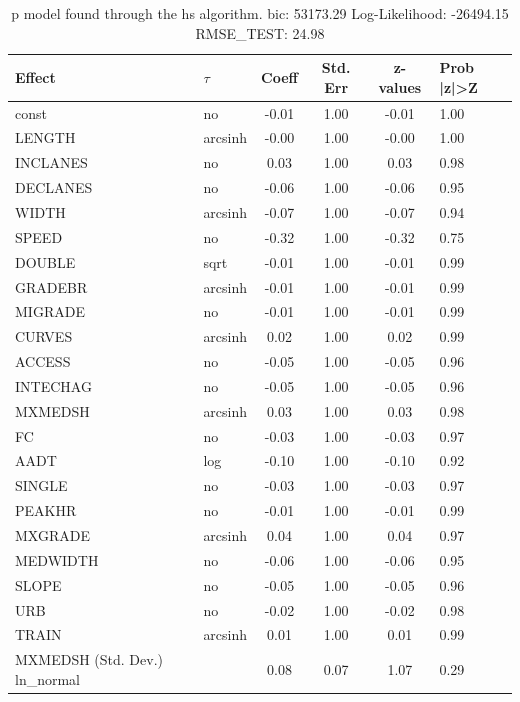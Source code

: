 \begin{table}
	\caption{p model found through the hs algorithm. bic: 53173.29 Log-Likelihood: -26494.15 RMSE_TEST: 24.98}
	\begin{center}
		\begin{tabular}{|l|l|c|c|c|l|}
			\hline
			Effect & $\tau$ & Coeff & Std. Err & z-values & Prob |z|>Z \\
			\hline
			const & no & -0.01 & 1.00 & -0.01 & 1.00 \\
			\hline
			LENGTH & arcsinh & -0.00 & 1.00 & -0.00 & 1.00 \\
			\hline
			INCLANES & no & 0.03 & 1.00 & 0.03 & 0.98 \\
			\hline
			DECLANES & no & -0.06 & 1.00 & -0.06 & 0.95 \\
			\hline
			WIDTH & arcsinh & -0.07 & 1.00 & -0.07 & 0.94 \\
			\hline
			SPEED & no & -0.32 & 1.00 & -0.32 & 0.75 \\
			\hline
			DOUBLE & sqrt & -0.01 & 1.00 & -0.01 & 0.99 \\
			\hline
			GRADEBR & arcsinh & -0.01 & 1.00 & -0.01 & 0.99 \\
			\hline
			MIGRADE & no & -0.01 & 1.00 & -0.01 & 0.99 \\
			\hline
			CURVES & arcsinh & 0.02 & 1.00 & 0.02 & 0.99 \\
			\hline
			ACCESS & no & -0.05 & 1.00 & -0.05 & 0.96 \\
			\hline
			INTECHAG & no & -0.05 & 1.00 & -0.05 & 0.96 \\
			\hline
			MXMEDSH & arcsinh & 0.03 & 1.00 & 0.03 & 0.98 \\
			\hline
			FC & no & -0.03 & 1.00 & -0.03 & 0.97 \\
			\hline
			AADT & log & -0.10 & 1.00 & -0.10 & 0.92 \\
			\hline
			SINGLE & no & -0.03 & 1.00 & -0.03 & 0.97 \\
			\hline
			PEAKHR & no & -0.01 & 1.00 & -0.01 & 0.99 \\
			\hline
			MXGRADE & arcsinh & 0.04 & 1.00 & 0.04 & 0.97 \\
			\hline
			MEDWIDTH & no & -0.06 & 1.00 & -0.06 & 0.95 \\
			\hline
			SLOPE & no & -0.05 & 1.00 & -0.05 & 0.96 \\
			\hline
			URB & no & -0.02 & 1.00 & -0.02 & 0.98 \\
			\hline
			TRAIN & arcsinh & 0.01 & 1.00 & 0.01 & 0.99 \\
			\hline
			MXMEDSH (Std. Dev.) ln_normal &  & 0.08 & 0.07 & 1.07 & 0.29 \\

\end{tabular}
\end{center}
\end{table}
